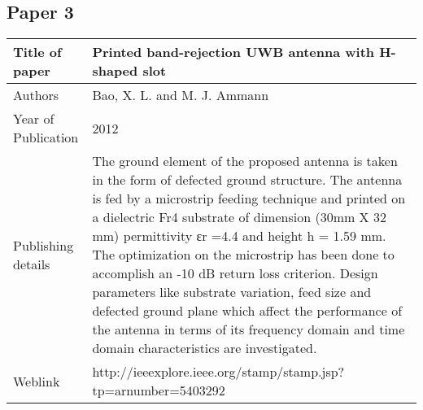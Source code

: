 \documentclass[12pt]{article}
\begin{document}
	\cleardoublepage
	 
	 \subsection{Paper 3}
	  \begin{center}
	  	\begin{table}[h]
	  		\centering
	  		\begin{tabular}{ |l|p{11cm}| }
	  			\hline
	  			Title of paper &  Printed band-rejection UWB antenna with H-shaped slot \\
	  			\hline
	  			Authors & Bao, X. L. and M. J. Ammann \\
	  			\hline
	  			Year of Publication & 2012 \\
	  			\hline
	  			Publishing details & The ground element of the proposed antenna is taken in the form of defected ground structure. The antenna is fed by a microstrip feeding technique and printed on a dielectric Fr4 substrate of dimension (30mm X 32 mm) permittivity εr =4.4 and height h = 1.59 mm. The optimization on the microstrip has been done to accomplish an -10 dB return loss criterion. Design parameters like substrate variation, feed size and defected ground plane which affect the performance of the antenna in terms of its frequency domain and time domain characteristics are investigated.\\
	  			\hline
	  			Weblink & http://ieeexplore.ieee.org/stamp/stamp.jsp?tp=arnumber=5403292 \\
	  			\hline			 
	  		\end{tabular}		
	  		
	  	\end{table}
	  \end{center}
\end{document}
